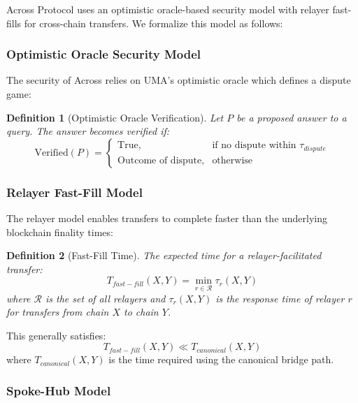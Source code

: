 \documentclass{article}
\newtheorem{definition}{Definition}
\begin{document}
Across Protocol uses an optimistic oracle-based security model with relayer fast-fills for cross-chain transfers. We formalize this model as follows:

\subsubsection{Optimistic Oracle Security Model}

The security of Across relies on UMA's optimistic oracle which defines a dispute game:

\begin{definition}[Optimistic Oracle Verification]
Let $P$ be a proposed answer to a query. The answer becomes verified if:
\begin{equation}
\text{Verified}(P) = \begin{cases}
\text{True}, & \text{if no dispute within } \tau_{dispute} \\
\text{Outcome of dispute}, & \text{otherwise}
\end{cases}
\end{equation}
\end{definition}

\subsubsection{Relayer Fast-Fill Model}

The relayer model enables transfers to complete faster than the underlying blockchain finality times:

\begin{definition}[Fast-Fill Time]
The expected time for a relayer-facilitated transfer:
\begin{equation}
T_{fast-fill}(X,Y) = \min_{r \in \mathcal{R}} \tau_{r}(X,Y)
\end{equation}
where $\mathcal{R}$ is the set of all relayers and $\tau_{r}(X,Y)$ is the response time of relayer $r$ for transfers from chain $X$ to chain $Y$.
\end{definition}

This generally satisfies:
\begin{equation}
T_{fast-fill}(X,Y) \ll T_{canonical}(X,Y)
\end{equation}
where $T_{canonical}(X,Y)$ is the time required using the canonical bridge path.

\subsubsection{Spoke-Hub Model}
\end{document}
